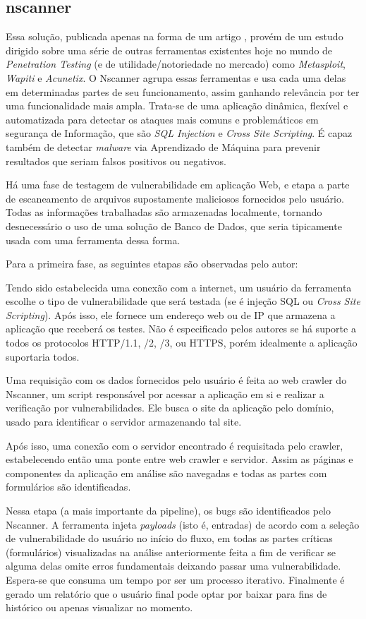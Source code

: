 \subsection{nscanner}
Essa solução, publicada apenas na forma de um artigo \cite{surian_nscanner_2020}, provém de um estudo dirigido sobre uma série de outras ferramentas existentes hoje no mundo de \textit{Penetration Testing} (e de utilidade/notoriedade no mercado) como \textit{Metasploit}, \textit{Wapiti} e\textit{ Acunetix}. O Nscanner agrupa essas ferramentas e usa cada uma delas em determinadas partes de seu funcionamento, assim ganhando relevância por ter uma funcionalidade mais ampla.  Trata-se de uma aplicação dinâmica, flexível e automatizada para detectar os ataques mais comuns e problemáticos em segurança de Informação, que são \textit{SQL Injection} e \textit{Cross Site Scripting}. É capaz também de detectar \textit{malware} via Aprendizado de Máquina para prevenir resultados que seriam falsos positivos ou negativos.

Há uma fase de testagem de vulnerabilidade em aplicação Web, e etapa a parte de escaneamento de arquivos supostamente maliciosos fornecidos pelo usuário. Todas as informações trabalhadas são armazenadas localmente, tornando desnecessário o uso de uma solução de Banco de Dados, que seria tipicamente usada com uma ferramenta dessa forma.

Para a primeira fase, as seguintes etapas são observadas pelo autor:
\begin{alineas}
\item Tendo sido estabelecida uma conexão com a internet, um usuário da ferramenta escolhe o tipo de vulnerabilidade que será testada (se é injeção SQL ou \textit{Cross Site Scripting}). Após isso, ele fornece um endereço web ou de IP que armazena a aplicação que receberá os testes. Não é especificado pelos autores se há suporte a todos os protocolos HTTP/1.1, /2, /3, ou HTTPS, porém idealmente a aplicação suportaria todos.
\item Uma requisição com os dados fornecidos pelo usuário é feita ao web crawler do Nscanner, um script responsável por acessar a aplicação em si e realizar a verificação por vulnerabilidades. Ele busca o site da aplicação pelo domínio, usado para identificar o servidor armazenando tal site.
\item Após isso, uma conexão com o servidor encontrado é requisitada pelo crawler, estabelecendo então uma ponte entre web crawler e servidor. Assim as páginas e componentes da aplicação em análise são navegadas e todas as partes com formulários são identificadas.
\item Nessa etapa (a mais importante da pipeline), os bugs são identificados pelo Nscanner. A ferramenta injeta \textit{payloads} (isto é, entradas) de acordo com a seleção de vulnerabilidade do usuário no início do fluxo, em todas as partes críticas (formulários) visualizadas na análise anteriormente feita a fim de verificar se alguma delas omite erros fundamentais deixando passar uma vulnerabilidade. Espera-se que consuma um tempo por ser um processo iterativo. Finalmente é gerado um relatório que o usuário final pode optar por baixar para fins de histórico ou apenas visualizar no momento.
\end{alineas}

